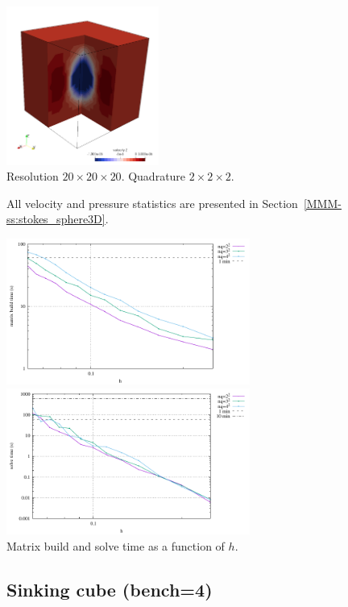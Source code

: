 \begin{center}
\includegraphics[width=5cm]{python_codes/fieldstone_82/results/bench3/w.png}\\
{\captionfont Resolution $20\times 20\times 20$. Quadrature $2\times 2 \times 2$.} 
\end{center}

All velocity and pressure statistics are presented in Section~\ref{MMM-ss:stokes_sphere3D}.

\begin{center}
\includegraphics[width=8cm]{python_codes/fieldstone_82/results/bench3/build.pdf}
\includegraphics[width=8cm]{python_codes/fieldstone_82/results/bench3/solve.pdf}\\
{\captionfont Matrix build and solve time as a function of $h$.}
\end{center}

\subsection*{Sinking cube (bench=4)}

